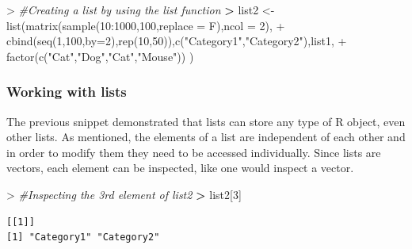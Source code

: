 \documentclass[
]{book}
\newenvironment{Shaded}{\begin{snugshade}}{\end{snugshade}}
\newcommand{\AttributeTok}[1]{\textcolor[rgb]{0.77,0.63,0.00}{#1}}
\newcommand{\CommentTok}[1]{\textcolor[rgb]{0.56,0.35,0.01}{\textit{#1}}}
\newcommand{\DecValTok}[1]{\textcolor[rgb]{0.00,0.00,0.81}{#1}}
\newcommand{\ErrorTok}[1]{\textcolor[rgb]{0.64,0.00,0.00}{\textbf{#1}}}
\newcommand{\FunctionTok}[1]{\textcolor[rgb]{0.00,0.00,0.00}{#1}}
\newcommand{\NormalTok}[1]{#1}
\newcommand{\OtherTok}[1]{\textcolor[rgb]{0.56,0.35,0.01}{#1}}
\newcommand{\SpecialCharTok}[1]{\textcolor[rgb]{0.00,0.00,0.00}{#1}}
\newcommand{\StringTok}[1]{\textcolor[rgb]{0.31,0.60,0.02}{#1}}
\theoremstyle{definition}
\theoremstyle{definition}
\theoremstyle{definition}
\theoremstyle{definition}
\theoremstyle{remark}
\begin{document}
\begin{Shaded}
\begin{Highlighting}[]
\SpecialCharTok{\textgreater{}} \CommentTok{\#Creating a list by using the list function}
\ErrorTok{\textgreater{}}\NormalTok{ list2 }\OtherTok{\textless{}{-}} \FunctionTok{list}\NormalTok{(}\FunctionTok{matrix}\NormalTok{(}\FunctionTok{sample}\NormalTok{(}\DecValTok{10}\SpecialCharTok{:}\DecValTok{1000}\NormalTok{,}\DecValTok{100}\NormalTok{,}\AttributeTok{replace =}\NormalTok{ F),}\AttributeTok{ncol =} \DecValTok{2}\NormalTok{),}
\SpecialCharTok{+}                     \FunctionTok{cbind}\NormalTok{(}\FunctionTok{seq}\NormalTok{(}\DecValTok{1}\NormalTok{,}\DecValTok{100}\NormalTok{,}\AttributeTok{by=}\DecValTok{2}\NormalTok{),}\FunctionTok{rep}\NormalTok{(}\DecValTok{10}\NormalTok{,}\DecValTok{50}\NormalTok{)),}\FunctionTok{c}\NormalTok{(}\StringTok{"Category1"}\NormalTok{,}\StringTok{"Category2"}\NormalTok{),list1,}
\SpecialCharTok{+}               \FunctionTok{factor}\NormalTok{(}\FunctionTok{c}\NormalTok{(}\StringTok{"Cat"}\NormalTok{,}\StringTok{"Dog"}\NormalTok{,}\StringTok{"Cat"}\NormalTok{,}\StringTok{"Mouse"}\NormalTok{)) )}
\end{Highlighting}
\end{Shaded}

\hypertarget{working-with-lists}{%
\subsubsection*{\texorpdfstring{\textbf{Working with lists}}{Working with lists}}\label{working-with-lists}}

The previous snippet demonstrated that lists can store any type of R object, even other lists.
As mentioned, the elements of a list are independent of each other and in order to modify them they need to be
accessed individually.
Since lists are vectors, each element can be inspected, like one would inspect a vector.

\begin{Shaded}
\begin{Highlighting}[]
\SpecialCharTok{\textgreater{}} \CommentTok{\#Inspecting the 3rd element of list2}
\ErrorTok{\textgreater{}}\NormalTok{ list2[}\DecValTok{3}\NormalTok{]}
\end{Highlighting}
\end{Shaded}

\begin{verbatim}
[[1]]
[1] "Category1" "Category2"
\end{verbatim}
\end{document}
